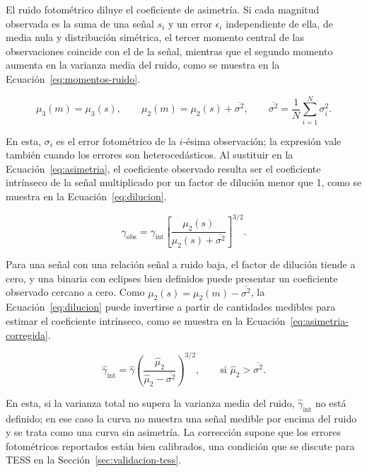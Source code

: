 \documentclass[12pt,letterpaper,oneside]{book}
\begin{document}
El ruido fotom\'etrico diluye el coeficiente de asimetr\'ia. Si cada magnitud observada es la suma de una se\~nal $s_i$ y un error $\epsilon_i$ independiente de ella, de media nula y distribuci\'on sim\'etrica, el tercer momento central de las observaciones coincide con el de la se\~nal, mientras que el segundo momento aumenta en la varianza media del ruido, como se muestra en la Ecuaci\'on~\eqref{eq:momentos-ruido}.

\begin{equation}
	\mu_3(m) = \mu_3(s), \qquad \mu_2(m) = \mu_2(s) + \overline{\sigma^2}, \qquad \overline{\sigma^2} = \frac{1}{N}\sum_{i=1}^{N}\sigma_i^2.
	\label{eq:momentos-ruido}
\end{equation}

En esta, $\sigma_i$ es el error fotom\'etrico de la $i$-\'esima observaci\'on; la expresi\'on vale tambi\'en cuando los errores son heteroced\'asticos. Al sustituir en la Ecuaci\'on~\eqref{eq:asimetria}, el coeficiente observado resulta ser el coeficiente intr\'inseco de la se\~nal multiplicado por un factor de diluci\'on menor que 1, como se muestra en la Ecuaci\'on~\eqref{eq:dilucion}.

\begin{equation}
	\gamma_{\mathrm{obs}} = \gamma_{\mathrm{int}}\left[\frac{\mu_2(s)}{\mu_2(s)+\overline{\sigma^2}}\right]^{3/2}.
	\label{eq:dilucion}
\end{equation}

Para una se\~nal con una relaci\'on se\~nal a ruido baja, el factor de diluci\'on tiende a cero, y una binaria con eclipses bien definidos puede presentar un coeficiente observado cercano a cero. Como $\mu_2(s)=\mu_2(m)-\overline{\sigma^2}$, la Ecuaci\'on~\eqref{eq:dilucion} puede invertirse a partir de cantidades medibles para estimar el coeficiente intr\'inseco, como se muestra en la Ecuaci\'on~\eqref{eq:asimetria-corregida}.

\begin{equation}
	\hat\gamma_{\mathrm{int}} = \hat\gamma\left(\frac{\hat\mu_2}{\hat\mu_2-\overline{\sigma^2}}\right)^{3/2}, \qquad \text{si } \hat\mu_2 > \overline{\sigma^2}.
	\label{eq:asimetria-corregida}
\end{equation}

En esta, si la varianza total no supera la varianza media del ruido, $\hat\gamma_{\mathrm{int}}$ no est\'a definido; en ese caso la curva no muestra una se\~nal medible por encima del ruido y se trata como una curva sin asimetr\'ia. La correcci\'on supone que los errores fotom\'etricos reportados est\'an bien calibrados, una condici\'on que se discute para TESS en la Secci\'on~\ref{sec:validacion-tess}.
\end{document}
